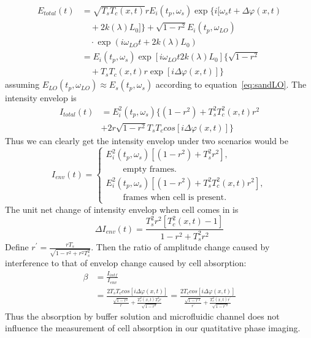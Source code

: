 \documentclass[aps,pra,reprint,superscriptaddress]{revtex4-1}
\begin{document}
\begin{equation}
\begin{split}
E_{total}(t) &= \sqrt{T_s T_c(x,t)} r E_i(t_p,\omega_s) \exp \lbrace i[\omega_s t + \Delta\varphi(x,t) \\
&\quad+ 2k(\lambda)L_0] \rbrace + \sqrt{1-r^2} E_i(t_p,\omega_{LO})\\
&\quad \cdot \exp(i\omega_{LO} t + 2k(\lambda)L_0) \\
&= E_i(t_p,\omega_{s}) \exp[i\omega_{LO} t 2k(\lambda)L_0] \lbrace \sqrt{1-r^2} \\
&\quad+ T_s T_c(x,t) r \exp [i\Delta\varphi(x,t)] \rbrace
\end{split}
\end{equation}
assuming $E_{LO}(t_p,\omega_{LO}) \approx E_s(t_p,\omega_s)$ according to equation~\ref{eq:sandLO}. The intensity envelop is
\begin{equation}
\begin{split}
I_{total}(t) &= E_i^2(t_p,\omega_{s}) \lbrace (1-r^2) + T_s^2 T_c^2(x,t) r^2 \\
&+ 2r\sqrt{1-r^2} T_s T_c cos[i\Delta\varphi(x,t)] \rbrace
\end{split}
\end{equation}
Thus we can clearly get the intensity envelop under two scenarios would be
\begin{equation}
I_{env}(t) = \begin{cases}
E_i^2(t_p,\omega_{s}) [(1-r^2) + T_s^2 r^2], \\
\quad\quad \text{empty frames}.\\
E_i^2(t_p,\omega_{s}) [(1-r^2) + T_s^2 T_c^2(x,t) r^2], \\
\quad\quad \text{frames when cell is present}.
  \end{cases}
\end{equation}
The unit net change of intensity envelop when cell comes in is
\begin{equation}
\Delta I_{env}(t) =
 \frac{T_s^2 r^2 [T_c^2(x,t) - 1]}{1 - r^2 + T_s^2 r^2}
\end{equation}
Define $r^\prime=\frac{rT_s}{\sqrt{1-r^2+r^2T_s^2}}$. Then the ratio of amplitude change caused by interference to that of envelop change caused by cell absorption:
\begin{equation}
\begin{split}
\beta &= \frac{I_{intf}}{I_{env}} \\
&= \frac{2 T_s T_c cos[i\Delta\varphi(x,t)]}{\frac{\sqrt{1-r^2}}{r} + \frac{T_c^2(x,t) T_s^2 r}{\sqrt{1-r^2}}} 
= \frac{2 T_c cos[i\Delta\varphi(x,t)]}{\frac{\sqrt{1-r^{\prime2}}}{r^\prime} + \frac{T_c^2(x,t) r^\prime}{\sqrt{1-r^{\prime2}}}}
\end{split}
\end{equation}
Thus the absorption by buffer solution and microfluidic channel does not influence the measurement of cell absorption in our quatitative phase imaging. 
\end{document}
